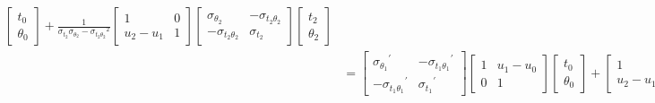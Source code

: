 \documentclass{article}
\begin{document}
\begin{align*}
\begin{bmatrix}
                t_0\\
                \theta_0
            \end{bmatrix}
            +
            \tfrac{1}{\sigma_{t_2}\sigma_{\theta_2}-{\sigma_{t_2\theta_2}}^2}
            \begin{bmatrix}
                1 & 0\\
                u_2-u_1 & 1
            \end{bmatrix}\!\!
            \begin{bmatrix}
                \sigma_{\theta_2} & -\sigma_{t_2\theta_2}\\
                -\sigma_{t_2\theta_2} & \sigma_{t_2}
            \end{bmatrix}\!\!
            \begin{bmatrix}
                t_2\\
                \theta_2
            \end{bmatrix}
            \\
            &=
            \begin{bmatrix}
                {\sigma_{\theta_1}}^{'} & -{\sigma_{t_1\theta_1}}^{'}\\
                -{\sigma_{t_1\theta_1}}^{'} & {\sigma_{t_1}}^{'}
            \end{bmatrix}
            \begin{bmatrix}
                1 & u_1-u_0\\
                0 & 1
            \end{bmatrix}
            \begin{bmatrix}
                t_0\\
                \theta_0
            \end{bmatrix}
            +
            \begin{bmatrix}
                1 & 0\\
                u_2-u_1 & 1
            \end{bmatrix}
            \begin{bmatrix}
                  {\sigma_{\theta_2}}^{'} & -{\sigma_{t_2\theta_2}}^{'}\\
                -{\sigma_{t_2\theta_2}}^{'} & {\sigma_{t_2}}^{'}
            \end{bmatrix}
            \begin{bmatrix}
                t_2\\
                \theta_2
            \end{bmatrix}
            \\

\end{align*}
\end{document}
